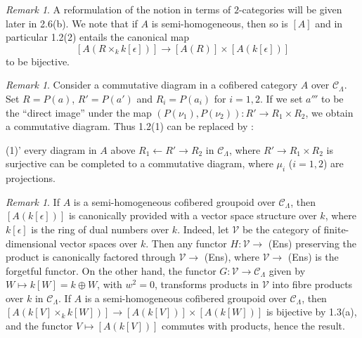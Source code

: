 \documentclass[11pt]{article}
\theoremstyle{plain}
\theoremstyle{definition}
\theoremstyle{remark}
\newtheorem{remark}[theorem]{Remark}
\begin{document}
\begin{remark}
A reformulation of the notion in terms of $2$-categories will be given later in 2.6(b). We note that if $A$ is semi-homogeneous, then so is $[A]$ and in particular 1.2(2) entails the canonical map
\[
[A(R \times_k k[\epsilon])] \longrightarrow [A(R)] \times [A(k[\epsilon])]
\]
to be bijective.
\end{remark}

\begin{remark}
Consider a commutative diagram in a cofibered category $A$ over $\mathcal{C}_\Lambda$. Set $R = P(a)$, $R' = P(a')$ and $R_i = P(a_i)$ for $i = 1, 2$. If we set $a'''$ to be the ``direct image'' under the map $(P(\nu_1), P(\nu_2)): R' \to R_1 \times R_2$, we obtain a commutative diagram. Thus 1.2(1) can be replaced by :

(1)' every diagram in $A$ above $R_1 \leftarrow R' \to R_2$ in $\mathcal{C}_\Lambda$, where $R' \to R_1 \times R_2$ is surjective can be completed to a commutative diagram, where $\mu_i$ ($i = 1, 2$) are projections.
\end{remark}

\begin{remark}
If $A$ is a semi-homogeneous cofibered groupoid over $\mathcal{C}_\Lambda$, then $[A(k[\epsilon])]$ is canonically provided with a vector space structure over $k$, where $k[\epsilon]$ is the ring of dual numbers over $k$. Indeed, let $\mathcal{V}$ be the category of finite-dimensional vector spaces over $k$. Then any functor $H: \mathcal{V} \to$ (Ens) preserving the product is canonically factored through $\mathcal{V} \to$ (Ens), where $\mathcal{V} \to$ (Ens) is the forgetful functor. On the other hand, the functor $G: \mathcal{V} \to \mathcal{C}_\Lambda$ given by $W \mapsto k[W] = k \oplus W$, with $w^2 = 0$, transforms products in $\mathcal{V}$ into fibre products over $k$ in $\mathcal{C}_\Lambda$. If $A$ is a semi-homogeneous cofibered groupoid over $\mathcal{C}_\Lambda$, then $[A(k[V] \times_k k[W])] \to [A(k[V])] \times [A(k[W])]$ is bijective by 1.3(a), and the functor $V \mapsto [A(k[V])]$ commutes with products, hence the result.
\end{remark}
\end{document}
